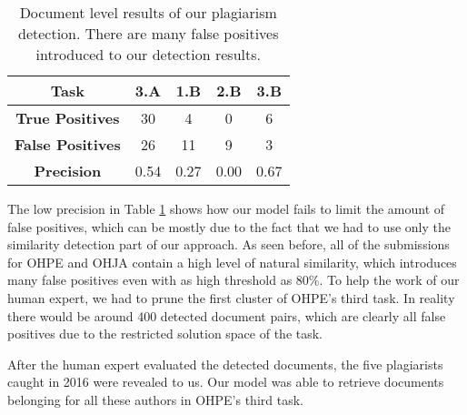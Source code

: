 \newpage


\begin{table}[ht]
\centering
\caption{Document level results of our plagiarism detection. There are many false positives introduced to our detection results.}
\begin{tabular}{|c|c|c|c|c|}
\hline
\bf Task      & 3.A   & 1.B   & 2.B & 3.B   \\ \hline
\bf True Positives        & 30   & 4    & 0  & 6    \\ \hline
\bf False Positives        & 26   & 11   & 9  & 3    \\ \hline
\bf Precision & 0.54 & 0.27 & 0.00  & 0.67 \\ \hline
\end{tabular}
\label{tbl-plgdet-final-res}
\end{table}

\noindent
The low precision in Table \ref{tbl-plgdet-final-res} shows how our model fails to limit the amount of false positives, which can be mostly due to the fact that we had to use only the similarity detection part of our approach. As seen before, all of the submissions for OHPE and OHJA contain a high level of natural similarity, which introduces many false positives even with as high threshold as 80\%. To help the work of our human expert, we had to prune the first cluster of OHPE's third task. In reality there would be around 400 detected document pairs, which are clearly all false positives due to the restricted solution space of the task.


After the human expert evaluated the detected documents, the five plagiarists caught in 2016 were revealed to us. Our model was able to retrieve documents belonging for all these authors in OHPE's third task. 

\newpage
